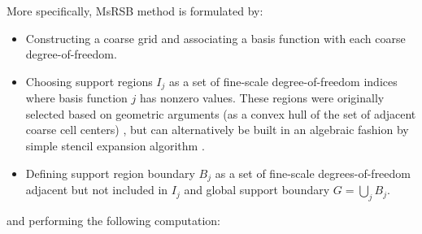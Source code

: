 More specifically, MsRSB method is formulated by:
\begin{itemize}
    \item Constructing a coarse grid and associating a basis function with each coarse degree-of-freedom.
    \item Choosing support regions $I_j$ as a set of fine-scale degree-of-freedom indices where basis function $j$ has nonzero values.   These regions were originally selected based on geometric arguments (as a convex hull of the set of adjacent coarse cell centers) \cite{Moyner2016,Moyner2017}, but can alternatively be built in an algebraic fashion by simple stencil expansion algorithm \cite{Nilsen2020}.
    \item Defining support region boundary $B_j$ as a set of fine-scale degrees-of-freedom adjacent but not included in $I_j$ and global support boundary $G = \bigcup_j B_j$.
\end{itemize}
and performing the following computation:

